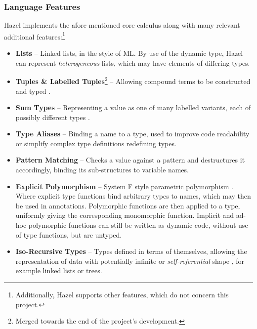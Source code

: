 \subsubsection{Language Features}\label{sec:HazelAdditionalFeatures}
Hazel implements the afore mentioned core calculus along with many relevant additional features:\footnote{Additionally, Hazel supports other features, which do not concern this project.}
\begin{itemize}
\item \textbf{Lists} -- Linked lists, in the style of ML. By use of the dynamic type, Hazel can represent \textit{heterogeneous} lists, which may have elements of differing types.  
\item \textbf{Tuples \& Labelled Tuples}\footnote{Merged towards the end of the project's development.} -- Allowing compound terms to be constructed and typed \cite[ch. 11.7-8]{TAPL}.
\item \textbf{Sum Types} -- Representing a value as one of many labelled variants, each of possibly different types \cite[ch. 11.10]{TAPL}.
\item \textbf{Type Aliases} -- Binding a name to a type, used to improve code readability or simplify complex type definitions redefining types.
\item \textbf{Pattern Matching} -- Checks a value against a pattern and destructures it accordingly, binding its sub-structures to variable names.
\item \textbf{Explicit Polymorphism} -- System F style parametric polymorphism \cite[ch. 23]{TAPL}. Where explicit type functions bind arbitrary types to names, which may then be used in annotations. Polymorphic functions are then applied to a type, uniformly giving the corresponding monomorphic function. Implicit and ad-hoc polymorphic functions can still be written as dynamic code, without use of type functions, but are untyped.
\item \textbf{Iso-Recursive Types} -- Types defined in terms of themselves, allowing the representation of data with potentially infinite or \textit{self-referential} shape \cite[ch. 22-23]{TAPL}, for example linked lists or trees.
\end{itemize}

